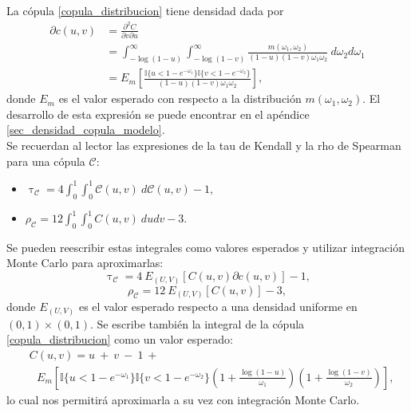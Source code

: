\documentclass[11pt,a4paper]{article}
\begin{document}
La cópula \eqref{copula_distribucion} tiene densidad dada por
\begin{align}
\partial c(u, v) &= \frac{\partial^2C}{\partial v \partial u}\nonumber\\
&= \int_{-\log (1-u)}^\infty \int_{-\log (1-v)}^\infty \frac{m(\omega_1, \omega_2)}{(1-u)(1-v)\omega_1\omega_2} \ d\omega_2 d\omega_1 \nonumber\\
&= E_{m} \left[\frac{\mathbb{I}\lbrace u < 1-e^{-\omega_1}\rbrace \mathbb{I}\lbrace v < 1-e^{-\omega_2} \rbrace}{(1-u)(1-v)\omega_1\omega_2}\right],
\end{align}
donde $E_m$ es el valor esperado con respecto a la distribución $m(\omega_1, \omega_2)$. El desarrollo de esta expresión se puede encontrar en el apéndice \ref{sec_densidad_copula_modelo}.\\

Se recuerdan al lector las expresiones de la tau de Kendall y la rho de Spearman para una cópula $\mathcal{C}$:
\begin{itemize}
\item $\uptau_{\mathcal{C}} = 4\int_{0}^1\int_{0}^1\mathcal{C}(u, v) \ d\mathcal{C}(u, v) - 1,$\\
\item $\rho_{\mathcal{C}} = 12\int_0^1 \int_0^1 C(u, v) \ dudv-3.$
\end{itemize}
Se pueden reescribir estas integrales como valores esperados y utilizar integración Monte Carlo para aproximarlas:
\begin{equation} \label{tau_esperado}
\uptau_{\mathcal{C}} = 4 \ E_{(U, V)}\left[C(u, v) \partial c(u, v)\right] -1,
\end{equation}
\begin{equation} \label{rho_esperado}
\rho_{\mathcal{C}} = 12 \ E_{(U, V)}\left[C(u, v)\right] -3,
\end{equation}
donde $E_{(U, V)}$ es el valor esperado respecto a una densidad uniforme en \newline $(0, 1)\times (0, 1).$ Se escribe también la integral de la cópula \eqref{copula_distribucion} como un valor esperado:
\begin{align*}
&C(u, v) = u \ + \ v \ - \ 1 \ +\\
& \ \ \ E_{m} \left[\mathbb{I}\lbrace u < 1-e^{-\omega_1}\rbrace \mathbb{I}\lbrace v < 1-e^{-\omega_2}\rbrace \left(1 + \frac{\log (1-u)}{\omega_1}\right)\left(1 + \frac{\log (1-v)}{\omega_2}\right)\right],
\end{align*}
lo cual nos permitirá aproximarla a su vez con integración Monte Carlo.\\
\end{document}
